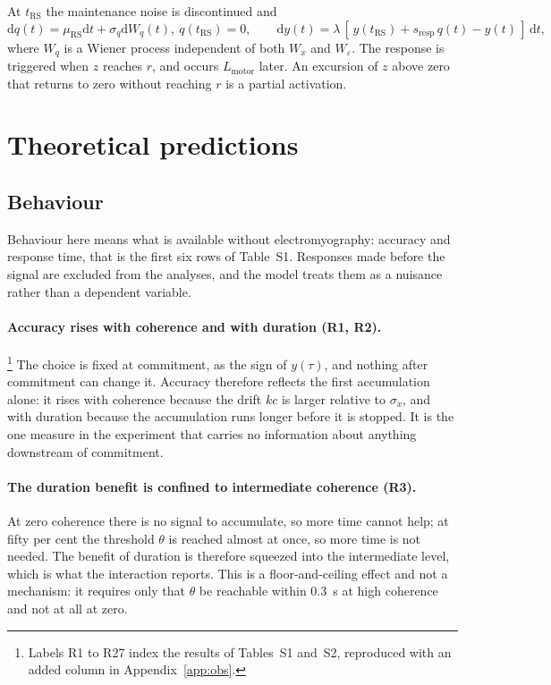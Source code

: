 \documentclass[a4paper,11pt]{article}
\newcommand{\dd}{\mathrm d}
\newcommand{\1}{\mathbbm{1}}
\newcommand{\Lmo}{L_{\mathrm{motor}}}
\newcommand{\trs}{t_{\mathrm{RS}}}
\newcommand{\sresp}{s_{\mathrm{resp}}}
\begin{document}
At $\trs$ the maintenance noise is discontinued and
\begin{equation}
\dd q(t)=\mu_{\mathrm{RS}}\dd t+\sigma_q\dd W_q(t),\ q(\trs)=0,
\qquad
\dd y(t)=\lambda\,[\,y(\trs)+\sresp\,q(t)-y(t)\,]\,\dd t,
\label{eq:resp}
\end{equation}
where $W_q$ is a Wiener process independent of both $W_x$ and $W_\varepsilon$. The
response is triggered when $z$ reaches $r$, and occurs $\Lmo$ later. An excursion of $z$
above zero that returns to zero without reaching $r$ is a partial activation.

\section{Theoretical predictions}
\label{sec:pred}

\subsection{Behaviour}

Behaviour here means what is available without electromyography: accuracy and response
time, that is the first six rows of Table~S1. Responses made before the signal are
excluded from the analyses, and the model treats them as a nuisance rather than a
dependent variable.

\paragraph{Accuracy rises with coherence and with duration (R1, R2).}\footnote{Labels R1
to R27 index the results of Tables~S1 and~S2, reproduced with an added column in
Appendix~\ref{app:obs}.} The choice is fixed at commitment, as the sign of $y(\tau)$, and
nothing after commitment can change it. Accuracy therefore reflects the first
accumulation alone: it rises with coherence because the drift $kc$ is larger relative to
$\sigma_x$, and with duration because the accumulation runs longer before it is stopped.
It is the one measure in the experiment that carries no information about anything
downstream of commitment.

\paragraph{The duration benefit is confined to intermediate coherence (R3).} At zero
coherence there is no signal to accumulate, so more time cannot help; at fifty per cent
the threshold $\theta$ is reached almost at once, so more time is not needed. The benefit
of duration is therefore squeezed into the intermediate level, which is what the
interaction reports. This is a floor-and-ceiling effect and not a mechanism: it requires
only that $\theta$ be reachable within $0.3$~s at high coherence and not at all at zero.
\end{document}
